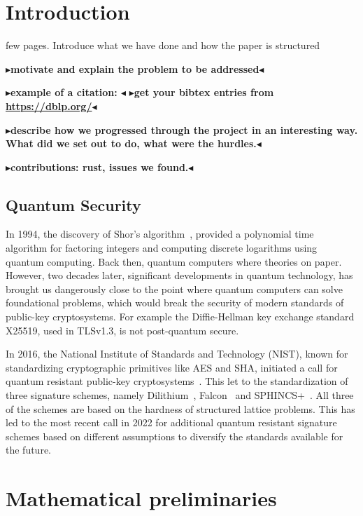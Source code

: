 \documentclass[twoside,11pt,openright]{report}
\theoremstyle{definition}
\theoremstyle{plain}
\newcommand{\todo}[1]{{\color[rgb]{.5,0,0}\textbf{$\blacktriangleright$#1$\blacktriangleleft$}}}
\begin{document}
\chapter{Introduction}
\label{ch:intro}

few pages. Introduce what we have done and how the paper is structured

\todo{motivate and explain the problem to be addressed}

\todo{example of a citation: \cite{DBLP:conf/sas/ChristensenMS03}}
\todo{get your bibtex entries from \url{https://dblp.org/}}

\todo{describe how we progressed through the project in an interesting way. What did we set out to do, what were the hurdles.}

\todo{contributions: rust, issues we found.}

\section{Quantum Security}
\label{sec:quantum}

In 1994, the discovery of Shor's algorithm~\cite{shor1997}, provided a polynomial time algorithm for factoring integers and computing discrete logarithms using quantum computing. Back then, quantum computers where theories on paper. However, two decades later, significant developments in quantum technology, has brought us dangerously close to the point where quantum computers can solve foundational problems, which would break the security of modern standards of public-key cryptosystems. For example the Diffie-Hellman key exchange standard X25519, used in TLSv1.3, is not post-quantum secure.

In 2016, the National Institute of Standards and Technology (NIST), known for standardizing cryptographic primitives like AES and SHA, initiated a call for quantum resistant public-key cryptosystems~\cite{nistcall}. This let to the standardization of three signature schemes, namely Dilithium~\cite{ducas2018crystals}, Falcon~\cite{fouque2018falcon} and SPHINCS+~\cite{bernstein2019sphincs+}. All three of the schemes are based on the hardness of structured lattice problems. This has led to the most recent call in 2022 for additional quantum resistant signature schemes based on different assumptions to diversify the standards available for the future.


\chapter{Mathematical preliminaries}
\label{ch:desc}
\end{document}
